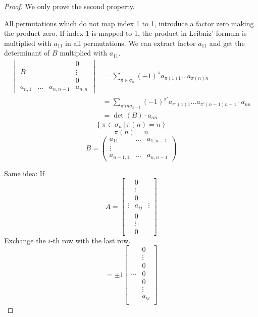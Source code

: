 \documentclass{article}
\newcommand{\setdef}[2]{\left\{\left.#1\,\right|\,#2\right\}}
\begin{document}
\begin{proof}
  We only prove the second property.

  All permutations which do not map index 1 to 1, introduce a factor zero making the product zero.
  If index 1 is mapped to 1, the product in Leibniz' formula is multiplied with $a_{11}$ in all permutations.
  We can extract factor $a_{11}$ and get the determinant of $B$ multiplied with $a_{11}$.
  \begin{align*}
    \begin{vmatrix}
             &         &           & 0  \\
      B      &         &           & \vdots \\
             &         &           & 0  \\
      a_{n,1} & \ldots & a_{n,n-1} & a_{n,n}
    \end{vmatrix}
    &= \sum_{\pi \in \sigma_n} (-1)^{\pi} a_{\pi(1) 1} \dots a_{\pi(n) n} \\
    &= \sum_{\pi' in \sigma_{n-1}} (-1)^{\pi'} a_{\pi'(1) 1} \dots a_{\pi'(n-1) n-1} \cdot a_{nn} \\
    &= \det(B) \cdot a_{nn}
  \end{align*}
  \[ \setdef{\pi \in \sigma_n}{\pi(n) = n} \]
  \[ \pi(n) = n \]
  \[
    B = \begin{pmatrix}
      a_{11} & \ldots & a_{1,n-1} \\
      \vdots &        & \\
      a_{n-1,1} & \ldots & a_{n,n-1}
    \end{pmatrix}
  \]

  Same idea: If
  \[
    A = \begin{bmatrix}
      & 0 & \\
      & \vdots & \\
      & 0 & \\
      \vdots & a_{ij} & \vdots \\
      & 0 & \\
      & \vdots & \\
      & 0 &
    \end{bmatrix}
  \]
  Exchange the $i$-th row with the last row.
  \[
    = \pm 1 \begin{bmatrix}
      & 0 \\
      & \vdots \\
      & 0 \\
      \cdots & 0 \\
      & 0 \\
      & \vdots \\
      & a_{ij} \\
    \end{bmatrix}
  \]
\end{proof}
\end{document}
